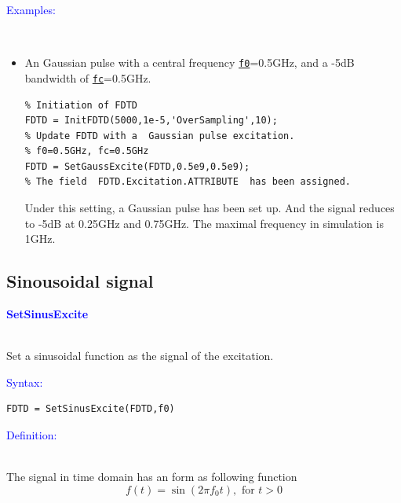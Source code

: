 	\textcolor{blue}{\begin{large}Examples:\end{large}}\\
\begin{itemize}
\item An Gaussian pulse with a central frequency \hyperref[para:f0]{\texttt{f0}}=0.5GHz, and a -5dB bandwidth of \hyperref[para:fc]{\texttt{fc}}=0.5GHz. 
\begin{lstlisting}
% Initiation of FDTD 
FDTD = InitFDTD(5000,1e-5,'OverSampling',10);
% Update FDTD with a  Gaussian pulse excitation. 
% f0=0.5GHz, fc=0.5GHz
FDTD = SetGaussExcite(FDTD,0.5e9,0.5e9);
% The field  FDTD.Excitation.ATTRIBUTE  has been assigned.
\end{lstlisting}
Under this setting, a Gaussian pulse has been set up. And the signal reduces to -5dB at 0.25GHz and 0.75GHz. The maximal frequency in simulation is 1GHz.
\end{itemize}

    \subsection{Sinousoidal signal}\label{subsec:Sinousoidal signal}
\textcolor{blue}{\begin{large}\textbf{SetSinusExcite}	\end{large}} \label{func:SetSinusExcite}\\
	  Set a sinusoidal function as the signal of the excitation.

\textcolor{blue}{\begin{large}Syntax:\end{large}}
 \begin{lstlisting}
FDTD = SetSinusExcite(FDTD,f0)
 \end{lstlisting}

\textcolor{blue}{\begin{large}Definition:\end{large}}\\
      The signal in time domain has an form as following function\\
\begin{equation}\label{equ:SinusoidalSignal_time}
 f(t)=\sin{(2\pi f_0t)}, \text{ for } t>0
\end{equation}

